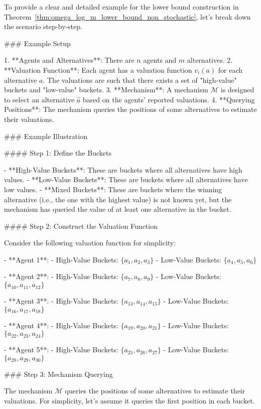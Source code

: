 To provide a clear and detailed example for the lower bound construction in Theorem~\ref{thm:omega_log_m_lower_bound_non_stochastic}, let's break down the scenario step-by-step.

### Example Setup

1. **Agents and Alternatives**: There are \( n \) agents and \( m \) alternatives.
2. **Valuation Function**: Each agent has a valuation function \( v_i(a) \) for each alternative \( a \). The valuations are such that there exists a set of "high-value" buckets and "low-value" buckets.
3. **Mechanism**: A mechanism \( \mathcal{M} \) is designed to select an alternative \( \widehat{a} \) based on the agents' reported valuations.
4. **Querying Positions**: The mechanism queries the positions of some alternatives to estimate their valuations.

### Example Illustration

#### Step 1: Define the Buckets

- **High-Value Buckets**: These are buckets where all alternatives have high values.
- **Low-Value Buckets**: These are buckets where all alternatives have low values.
- **Mixed Buckets**: These are buckets where the winning alternative (i.e., the one with the highest value) is not known yet, but the mechanism has queried the value of at least one alternative in the bucket.

#### Step 2: Construct the Valuation Function

Consider the following valuation function for simplicity:

- **Agent 1**:
  - High-Value Buckets: \( \{a_1, a_2, a_3\} \)
  - Low-Value Buckets: \( \{a_4, a_5, a_6\} \)

- **Agent 2**:
  - High-Value Buckets: \( \{a_7, a_8, a_9\} \)
  - Low-Value Buckets: \( \{a_{10}, a_{11}, a_{12}\} \)

- **Agent 3**:
  - High-Value Buckets: \( \{a_{13}, a_{14}, a_{15}\} \)
  - Low-Value Buckets: \( \{a_{16}, a_{17}, a_{18}\} \)

- **Agent 4**:
  - High-Value Buckets: \( \{a_{19}, a_{20}, a_{21}\} \)
  - Low-Value Buckets: \( \{a_{22}, a_{23}, a_{24}\} \)

- **Agent 5**:
  - High-Value Buckets: \( \{a_{25}, a_{26}, a_{27}\} \)
  - Low-Value Buckets: \( \{a_{28}, a_{29}, a_{30}\} \)

### Step 3: Mechanism Querying

The mechanism \( \mathcal{M} \) queries the positions of some alternatives to estimate their valuations. For simplicity, let's assume it queries the first position in each bucket.


